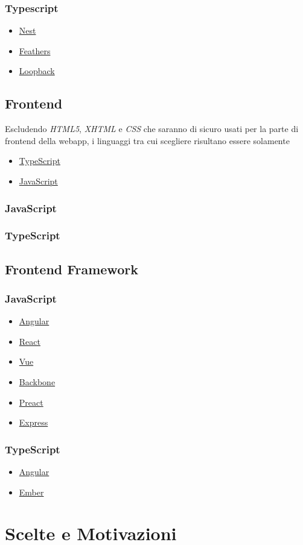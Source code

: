 \documentclass[a4paper, 12pt]{article}
\begin{document}
\subsubsection{Typescript}
\begin{itemize}
    \item \href{https://nestjs.com/}{Nest}
    \item \href{https://feathersjs.com/}{Feathers}
    \item \href{https://loopback.io/}{Loopback}
\end{itemize}
\subsection{Frontend}
Escludendo \textit{HTML5}, \textit{XHTML} e \textit{CSS} che saranno di sicuro usati per la parte di frontend della webapp, i linguaggi tra cui scegliere risultano essere solamente
\begin{itemize}
    \item \href{https://www.typescriptlang.org/}{TypeScript}
    \item \href{https://www.javascript.com/}{JavaScript}
\end{itemize}
\subsubsection{JavaScript}
\subsubsection{TypeScript}

\subsection{Frontend Framework}
\subsubsection{JavaScript}
\begin{itemize}
    \item \href{https://angularjs.org/}{Angular}
    \item \href{https://react.dev/}{React}
    \item \href{https://vuejs.org/}{Vue}
    \item \href{https://backbonejs.org/}{Backbone}
    \item \href{https://preactjs.com/}{Preact}
    \item \href{https://expressjs.com/}{Express}
\end{itemize}
\subsubsection{TypeScript}
\begin{itemize}
    \item \href{https://angularjs.org/}{Angular}
    \item \href{https://emberjs.com/}{Ember}
\end{itemize}

\newpage
\section{Scelte e Motivazioni}
\end{document}
